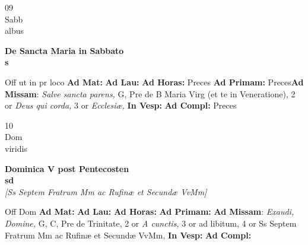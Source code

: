 \documentclass[10pt, openany]{book}
\begin{document}
        \begin{center}
            \begin{minipage}{3.5in}
                \vspace{2em}
                \begin{minipage}{0.5in}
                    {\Huge 09} \\
                    {\normalsize Sabb} \\
                    {\normalsize albus}
                \end{minipage}
                \begin{minipage}{3.0in}
                    \textbf{ \large De Sancta Maria in Sabbato \\
                    \textnormal{\normalsize s}} \\ 
                \end{minipage}
                \begin{justify}Off ut in pr loco
                    \textbf{Ad Mat: }
                    \textbf{Ad Lau: }
                    \textbf{Ad Horas: }Preces
                    \textbf{Ad Primam: }Preces\textbf{Ad Missam}: \textit{Salve sancta parens,} G, Pre de B Maria Virg (et te in Veneratione), 2 or \textit{Deus qui corda,} 3 or \textit{Ecclesiæ,}  
                    \textbf{In Vesp: }
                    \textbf{Ad Compl: }Preces
                \end{justify}
            \end{minipage}
        \end{center}
    
        \begin{center}
            \begin{minipage}{3.5in}
                \vspace{2em}
                \begin{minipage}{0.5in}
                    {\Huge 10} \\
                    {\normalsize Dom} \\
                    {\normalsize viridis}
                \end{minipage}
                \begin{minipage}{3.0in}
                    \textbf{ \large Dominica V post Pentecosten \\
                    \textnormal{\normalsize sd}} \\ \textit{[Ss Septem Fratrum Mm ac Rufinæ et Secundæ VvMm]} \\ 
                \end{minipage}
                \begin{justify}Off Dom
                    \textbf{Ad Mat: }
                    \textbf{Ad Lau: }
                    \textbf{Ad Horas: }
                    \textbf{Ad Primam: }\textbf{Ad Missam}: \textit{Exaudi, Domine,} G, C, Pre de Trinitate, 2 or \textit{A cunctis,} 3 or ad libitum, 4 or Ss Septem Fratrum Mm ac Rufinæ et Secundæ VvMm,  
                    \textbf{In Vesp: }
                    \textbf{Ad Compl: }
                \end{justify}
            \end{minipage}
        \end{center}
    
\end{document}
